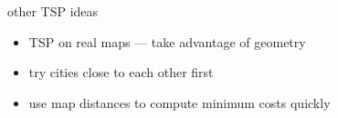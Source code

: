 \begin{frame}{other TSP ideas}
\begin{itemize}
\item TSP on real maps --- take advantage of geometry
\item try cities close to each other first
\item use map distances to compute minimum costs quickly
\end{itemize}
\end{frame}
